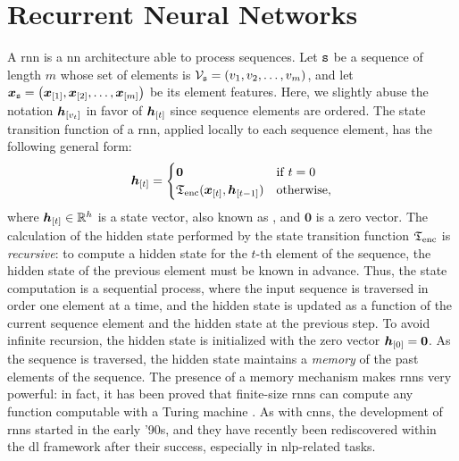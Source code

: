 \section{Recurrent Neural Networks}\label{sec:rnns}
A \gls{rnn} is a \gls{nn} architecture able to process sequences. Let $\mathtt{s}$ be a sequence of length $m$ whose set of elements is $\Nodes_{\Seq{s}} = (v_1, v_2, \ldots, v_m)$, and let $\Vector{x}_{\Seq{s}} = \Par{\Elem{x}{1}, \Elem{x}{2}, \ldots, \Elem{x}{m}}$ be its element features. Here, we slightly abuse the notation $\Elem{h}{v_t}$ in favor of $\Elem{h}{t}$ since sequence elements are ordered. The state transition function of a \gls{rnn}, applied locally to each sequence element, has the following general form:
\begin{align*}
    \Elem{h}{t} =
    \begin{cases}
        \boldsymbol{0} & \mathrm{if}\; t = 0\\
        \EncTrans(\Elem{x}{t}, \Elem{h}{t-1}) & \mathrm{otherwise},
    \end{cases}
\end{align*}
where $\Elem{h}{t} \in \Real^h$ is a state vector, also known as , and $\boldsymbol{0}$ is a zero vector. The calculation of the hidden state performed by the state transition function $\mathfrak{T}_{\mathrm{enc}}$ is \emph{recursive}: to compute a hidden state for the $t$-th element of the sequence, the hidden state of the previous element must be known in advance. Thus, the state computation is a sequential process, where the input sequence is traversed in order one element at a time, and the hidden state is updated as a function of the current sequence element and the hidden state at the previous step. To avoid infinite recursion, the hidden state is initialized with the zero vector $\Elem{h}{0} = \boldsymbol{0}$. As the sequence is traversed, the hidden state maintains a \emph{memory} of the past elements of the sequence. The presence of a memory mechanism makes \glspl{rnn} very powerful: in fact, it has been proved that finite-size \glspl{rnn} can compute any function computable with a Turing machine \citep{siegelmann1995rnnturing}. As with \glspl{cnn}, the development of \glspl{rnn} started in the early '90s, and they have recently been rediscovered within the \gls{dl} framework after their success, especially in \gls{nlp}-related tasks.


